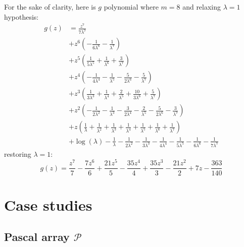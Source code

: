 For the sake of clarity, here is $g$ polynomial where $m=8$ and relaxing $\lambda=1$ hypothesis:
\begin{displaymath}
\begin{split}
g{\left (z \right )} &= \frac{z^{7}}{7 \lambda^{7}} \\
&+ z^{6} \left(- \frac{1}{6 \lambda^{6}} - \frac{1}{\lambda^{7}}\right) \\
&+ z^{5} \left(\frac{1}{5 \lambda^{5}} + \frac{1}{\lambda^{6}} + \frac{3}{\lambda^{7}}\right) \\
&+ z^{4} \left(- \frac{1}{4 \lambda^{4}} - \frac{1}{\lambda^{5}} - \frac{5}{2 \lambda^{6}} - \frac{5}{\lambda^{7}}\right) \\
&+ z^{3} \left(\frac{1}{3 \lambda^{3}} + \frac{1}{\lambda^{4}} + \frac{2}{\lambda^{5}} + \frac{10}{3 \lambda^{6}} + \frac{5}{\lambda^{7}}\right) \\
&+ z^{2} \left(- \frac{1}{2 \lambda^{2}} - \frac{1}{\lambda^{3}} - \frac{3}{2 \lambda^{4}} - \frac{2}{\lambda^{5}} - \frac{5}{2 \lambda^{6}} - \frac{3}{\lambda^{7}}\right) \\
&+ z \left(\frac{1}{\lambda} + \frac{1}{\lambda^{2}} + \frac{1}{\lambda^{3}} + \frac{1}{\lambda^{4}} + \frac{1}{\lambda^{5}} + \frac{1}{\lambda^{6}} + \frac{1}{\lambda^{7}}\right) \\
&+ \log{\left (\lambda \right )} - \frac{1}{\lambda} - \frac{1}{2 \lambda^{2}} - \frac{1}{3 \lambda^{3}} - \frac{1}{4 \lambda^{4}} - \frac{1}{5 \lambda^{5}} - \frac{1}{6 \lambda^{6}} - \frac{1}{7 \lambda^{7}}
\end{split}
\end{displaymath}
restoring $\lambda=1$:
\begin{displaymath}
g{\left (z \right )} = \frac{z^{7}}{7} - \frac{7 z^{6}}{6} + \frac{21 z^{5}}{5} - \frac{35 z^{4}}{4} + \frac{35 z^{3}}{3} - \frac{21 z^{2}}{2} + 7 z - \frac{363}{140}
\end{displaymath}


\section{Case studies}

\subsection{Pascal array $\mathcal{P}$}

